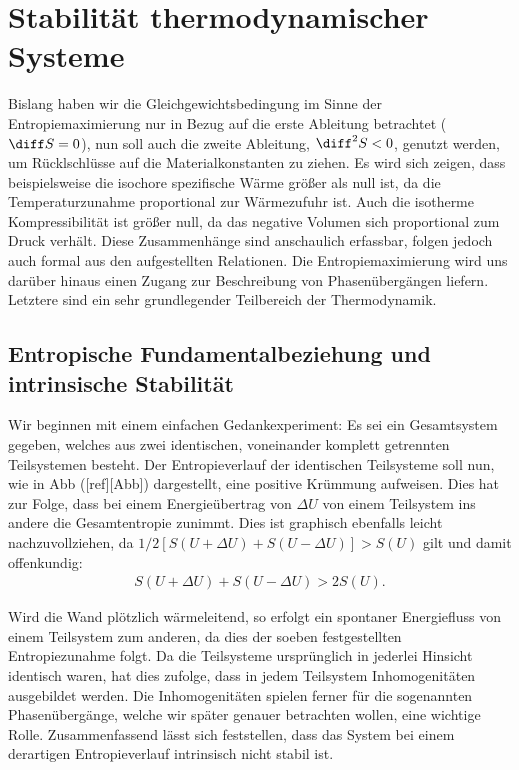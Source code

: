 
\chapter{Stabilität thermodynamischer Systeme\label{sec:Stabilitaet thermodynamischer Systeme}}
Bislang haben wir die Gleichgewichtsbedingung im Sinne der Entropiemaximierung nur in Bezug auf die erste Ableitung betrachtet ($\diff S=0$), nun soll auch die zweite Ableitung, $\diff^2S<0$, genutzt werden, um Rücklschlüsse auf die Materialkonstanten zu ziehen. Es wird sich zeigen, dass beispielsweise die isochore spezifische Wärme größer als null ist, da die Temperaturzunahme proportional zur Wärmezufuhr ist. Auch die isotherme Kompressibilität ist größer null, da das negative Volumen sich proportional zum Druck verhält. Diese Zusammenhänge sind anschaulich erfassbar, folgen jedoch auch formal aus den aufgestellten Relationen. Die Entropiemaximierung wird uns darüber hinaus einen Zugang zur Beschreibung von Phasenübergängen liefern. Letztere sind ein sehr grundlegender Teilbereich der Thermodynamik.

\section{Entropische Fundamentalbeziehung und intrinsische Stabilität}
Wir beginnen mit einem einfachen Gedankexperiment: Es sei ein Gesamtsystem gegeben, welches aus zwei identischen, voneinander komplett getrennten Teilsystemen besteht. Der Entropieverlauf der identischen Teilsysteme soll nun, wie in Abb ([ref][Abb]) dargestellt, eine positive Krümmung aufweisen. Dies hat zur Folge, dass bei einem Energieübertrag von $\Delta U$ von einem Teilsystem ins andere die Gesamtentropie zunimmt. Dies ist graphisch ebenfalls leicht nachzuvollziehen, da ${1/2\left[S(U+\Delta U)+S(U-\Delta U)\right]>S(U)}$ gilt und damit offenkundig:
\begin{align*}
    S(U+\Delta U)+S(U-\Delta U)>2 S(U).
\end{align*}

Wird die Wand plötzlich wärmeleitend, so erfolgt ein spontaner Energiefluss von einem Teilsystem zum anderen, da dies der soeben festgestellten Entropiezunahme folgt. Da die Teilsysteme ursprünglich in jederlei Hinsicht identisch waren, hat dies zufolge, dass in jedem Teilsystem Inhomogenitäten ausgebildet werden. Die Inhomogenitäten spielen ferner für die sogenannten Phasenübergänge, welche wir später genauer betrachten wollen, eine wichtige Rolle. Zusammenfassend lässt sich feststellen, dass das System bei einem derartigen Entropieverlauf intrinsisch nicht stabil ist.

